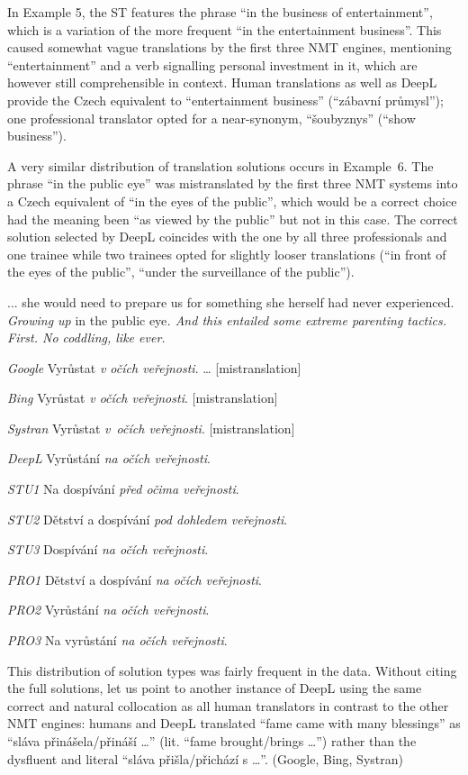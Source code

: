 \documentclass[output=paper]{langscibook}
\begin{document}
\z

In Example 5, the ST features the phrase “in the business of entertainment”, which is a variation of the more frequent “in the entertainment business”. This caused somewhat vague translations by the first three NMT engines, mentioning “entertainment” and a verb signalling personal investment in it, which are however still comprehensible in context. Human translations as well as DeepL provide the Czech equivalent to “entertainment business” (“zábavní průmysl”); one professional translator opted for a near-synonym, “šoubyznys” (“show business”).

A very similar distribution of translation solutions occurs in Example~6. The phrase “in the public eye” was mistranslated by the first three NMT systems into a Czech equivalent of “in the eyes of the public”, which would be a correct choice had the meaning been “as viewed by the public” but not in this case. The correct solution selected by DeepL coincides with the one by all three professionals and one trainee while two trainees opted for slightly looser translations (“in front of the eyes of the public”, “under the surveillance of the public”).

\ea \label{ex:kamenicka:2}

{... she would need to prepare us for something she herself had never experienced.} \textit{Growing up} in the public eye\textit{. And this entailed some extreme parenting tactics. First. No coddling, like ever.}

\textit{Google} Vyrůstat \textit{v očích veřejnosti}. … [mistranslation]

\textit{Bing} Vyrůstat \textit{v očích veřejnosti}. [mistranslation]

\textit{Systran} Vyrůstat \textit{v~očích veřejnosti}. [mistranslation]

\textit{DeepL} Vyrůstání \textit{na očích veřejnosti}.

\textit{STU1} Na dospívání \textit{před očima veřejnosti}.

\textit{STU2} Dětství a dospívání \textit{pod dohledem veřejnosti}.

\textit{STU3} Dospívání \textit{na očích veřejnosti}.

\textit{PRO1} Dětství a dospívání \textit{na očích veřejnosti}.

\textit{PRO2} Vyrůstání \textit{na očích veřejnosti}.

\textit{PRO3} Na vyrůstání \textit{na očích veřejnosti}.

\z
This distribution of solution types was fairly frequent in the data. Without citing the full solutions, let us point to another instance of DeepL using the same correct and natural collocation as all human translators in contrast to the other NMT engines: humans and DeepL translated “fame came with many blessings” as “sláva přinášela/přináší …” (lit. “fame brought/brings …”) rather than the dysfluent and literal “sláva přišla/přichází s …”. (Google, Bing, Systran)
\end{document}
